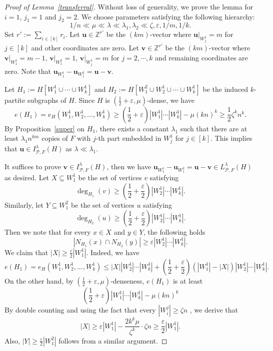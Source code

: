 \documentclass[10pt,a4paper]{amsart}
\begin{document}
\begin{proof}[Proof of Lemma~\ref{transferral}]
    Without loss of generality, we prove the lemma for $i=1$, $j_1=1$ and $j_2=2$. We choose parameters satisfying the following hierarchy:
    $$1/n\ll \mu \ll \lambda \ll \lambda_1,\lambda_2 \ll \zeta ,\varepsilon, 1/m, 1/k.$$
    Set $r':=\sum _{i\in [k]}r_i$. Let $\mathbf{u}\in \mathbb{Z}^{r'}$ be the $(km)$-vector where $\mathbf{u}|_{W_j^1}=m$ for $j\in [k]$ and other coordinates are zero. Let $\mathbf{v}\in \mathbb{Z}^{r'}$ be the $(km)$-vector where $\mathbf{v}|_{W_1^1}=m-1$, $\mathbf{v}|_{W_1^2}=1$, $\mathbf{v}|_{W_j^1}=m$ for $j=2,\cdots,k$ and remaining coordinates are zero. Note that $\mathbf{u}_{W_1^{1}} -\mathbf{u}_{W_1^{2}}=\mathbf{u}-\mathbf{v}$.
    
Let $H_1:=H[W_1^1\cup \cdots \cup W_k^1]$ and $H_2:=H[W^2_1\cup W_2^1\cup \cdots \cup W_k^1]$ be the induced $k$-partite subgraphs of $H$. Since $H$ is $(\frac{1}{2}+\varepsilon,\mu)$-dense, we have 
    $$e(H_1)=e_H(W_1^1,W_2^1,\dots ,W_k^1)\geq (\frac{1}{2}+\varepsilon)|W_1^1|\cdots |W_k^1|-\mu (kn)^k\geq \frac{1}{2}\zeta^kn^k.$$
By Proposition~\ref{super} on $H_1$, there exists a constant $\lambda_1$ such that there are at least $\lambda_1n^{km}$ copies of $F$ with $j$-th part embedded in $W_j^1$ for $j\in [k]$. This implies that $\mathbf{u}\in I^{\lambda}_{\mathcal{P},F}(H)$ as $\lambda\ll \lambda_1$.

It suffices to prove $\mathbf{v}\in I^{\lambda}_{\mathcal{P},F}(H)$, then we have $\mathbf{u}_{W_1^{1}} -\mathbf{u}_{W_1^{2}}=\mathbf{u}-\mathbf{v}\in L^{\lambda}_{\mathcal{P},F}(H)$ as desired. Let $X\subseteq W_1^1$ be the set of vertices $v$ satisfying 
$$\deg_{H_1}(v)\ge (\frac{1}{2}+\frac{\varepsilon}{2})|W_2^1|\cdots |W_k^1|.$$
Similarly, let $Y\subseteq W_1^2$ be the set of vertices $u$ satisfying 
$$\deg_{H_2}(u)\ge (\frac{1}{2}+\frac{\varepsilon}{2})|W_2^1|\cdots |W_k^1|.$$ 
Then we note that for every $x\in X$ and $y\in Y$, the following holds
\begin{equation}\label{eq:intersect}
|N_{H_1}(x)\cap N_{H_2}(y)|\ge \varepsilon |W_2^1|\cdots |W_k^1|.   
\end{equation}
We claim that $|X|\ge \frac{\varepsilon}{2}|W_1^1|$. Indeed, we have 
\[
e(H_1)=e_H(W_1^1,W_2^1,\dots ,W_k^1)\le |X||W_2^1|\cdots |W_k^1|+(\frac{1}{2}+\frac{\varepsilon}{2})(|W_1^1|-|X|)|W_2^1|\cdots |W_k^1|.
\]
On the other hand, by $(\frac{1}{2}+\varepsilon,\mu)$-denseness, $e(H_1)$ is at least 
$$(\frac{1}{2}+\varepsilon)|W_1^1|\cdots |W_k^1|-\mu (kn)^k$$
By double counting and using the fact that every $|W_i^j|\ge \zeta n$ , we derive that
\begin{equation}\label{eq:X-size}
|X|\ge \varepsilon|W_1^1|-\frac{2k^k\mu}{\zeta ^k}\cdot \zeta n\ge \frac{\varepsilon}{2}|W_1^1|.    
\end{equation}
Also, $|Y|\ge \frac{\varepsilon}{2}|W_1^2|$ follows from a similar argument.


\end{proof}
\end{document}
